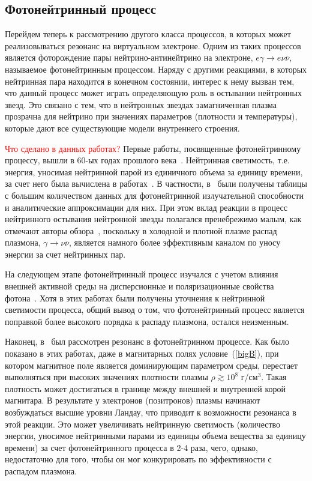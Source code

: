 \subsection{Фотонейтринный процесс}
Перейдем теперь к рассмотрению другого класса процессов, в которых может реализовываться резонанс на виртуальном электроне. Одним из таких процессов является фоторождение пары нейтрино-антинейтрино на электроне, $e\gamma\to e\nu\bar\nu$, называемое фотонейтринным процессом. Наряду с другими реакциями, в которых нейтринная пара находится в конечном состоянии, интерес к нему вызван тем, что данный процесс может играть определяющую роль в остывании нейтронных звезд. Это связано с тем, что в нейтронных звездах замагниченная плазма прозрачна для нейтрино при значениях параметров (плотности и температуры), которые дают все существующие модели внутреннего строения.

\textcolor{red}{Что сделано в данных работах?} Первые работы, посвященные фотонейтринному процессу, вышли в 60-ых годах прошлого века~\cite{Ritus:1961,Chiu:1961}. Нейтринная светимость, т.е. энергия, уносимая нейтринной парой из единичного объема за единицу времени, за счет него была вычислена в работах~\cite{Beaudet:1967,Dicus:1972,Munakata:1985,Shindler:1987,Itoh:1989,Itoh:1996,Skobelev:2000}. В частности, в~\cite{Itoh:1989,Itoh:1996} были получены таблицы с большим количеством данных для фотонейтринной излучательной способности и аналитические аппроксимации для них. При этом вклад реакции в процесс нейтринного остывания нейтронной звезды полагался пренебрежимо малым, как отмечают авторы обзора~\cite{Yakovlev2001}, поскольку в холодной и плотной плазме распад плазмона, $\gamma\to\nu\bar\nu$, является намного более эффективным каналом по уносу энергии за счет нейтринных пар.

На следующем этапе фотонейтринный процесс изучался с учетом влияния внешней активной среды на дисперсионные и поляризационные свойства фотона~\cite{RCh:2008,Borisov:2012,RumChMik}. Хотя в этих работах были получены уточнения к нейтринной светимости процесса, общий вывод о том, что фотонейтринный процесс является поправкой более высокого порядка к распаду плазмона, остался неизменным.

Наконец, в~\cite{Chistyakov:2014cga,qfthep2017} был рассмотрен резонанс в фотонейтринном процессе. Как было показано в этих работах, даже в магнитарных полях условие~(\ref{bigB}), при котором магнитное поле является доминирующим параметром среды, перестает выполняться при высоких значениях плотности плазмы $\rho \gtrsim 10^8$ г/см$^3$. Такая плотность может достигаться в границе между внешней и внутренней корой магнитара. В результате у электронов (позитронов) плазмы начинают возбуждаться высшие уровни Ландау, что приводит к возможности резонанса в этой реакции. 
Это может увеличивать нейтринную светимость (количество энергии, уносимое нейтринными парами из единицы объема вещества за единицу времени) за счет фотонейтринного процесса в 2-4 раза, чего, однако, недостаточно для того, чтобы он мог конкурировать по эффективности с распадом плазмона.